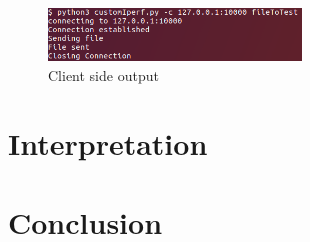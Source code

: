 \documentclass[a4paper]{article}
\begin{document}
\begin{figure}
\centering
\includegraphics[width=0.6\textwidth]{clientSide.png}
\caption{Client side output}
\end{figure}

\newpage
\section{Interpretation}

\newpage 
\section{Conclusion}

\newpage

\listoffigures
\end{document}
